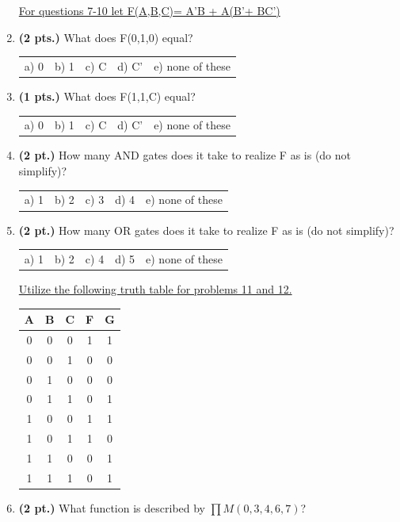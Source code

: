 \documentclass{article}
\begin{document}
\begin{enumerate}
\pagebreak
\underline{For questions 7-10 let F(A,B,C)= A'B + A(B'+ BC')}

\item {\bf (2 pts.)} What does F(0,1,0) equal?

\begin{tabular}{p{0.7in} p{0.7in} p{0.7in} p{0.7in} l}
a) 0 & b) 1 & c) C & d) C' & e) none of these
\end{tabular}

\item {\bf (1 pts.)} What does F(1,1,C) equal?

\begin{tabular}{p{0.7in} p{0.7in} p{0.7in} p{0.7in} l}
a) 0 & b) 1 & c) C & d) C' & e) none of these
\end{tabular}

\item {\bf (2 pt.)} How many AND gates does it take to realize F
as is (do not simplify)?

\begin{tabular}{p{0.7in} p{0.7in} p{0.7in} p{0.7in} l}
a) 1 & b) 2 & c) 3 & d) 4 & e) none of these
\end{tabular}

\item {\bf (2 pt.)} How many OR gates does it take to realize F
as is (do not simplify)?

\begin{tabular}{p{0.7in} p{0.7in} p{0.7in} p{0.7in} l}
a) 1 & b) 2 & c) 4 & d) 5 & e) none of these
\end{tabular}


\underline{Utilize the following truth table for problems 11 and 12.}

\begin{tabular}{c|c|c||c|c}
A & B & C & F & G \\ \hline \hline
0 & 0 & 0 & 1 & 1 \\ \hline
0 & 0 & 1 & 0 & 0 \\ \hline
0 & 1 & 0 & 0 & 0 \\ \hline
0 & 1 & 1 & 0 & 1 \\ \hline
1 & 0 & 0 & 1 & 1 \\ \hline
1 & 0 & 1 & 1 & 0 \\ \hline
1 & 1 & 0 & 0 & 1 \\ \hline
1 & 1 & 1 & 0 & 1 \\
\end{tabular} 

\item {\bf (2 pt.)} What function is described by $\prod M(0,3,4,6,7)$?


\end{enumerate}
\end{document}
